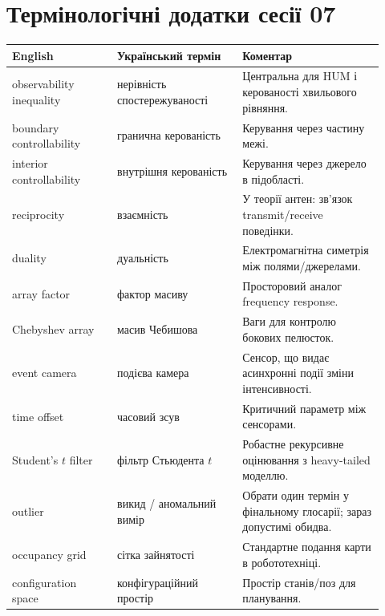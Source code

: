 \chapter{Термінологічні додатки сесії 07}

\begin{longtable}{L{0.26\linewidth}L{0.31\linewidth}L{0.35\linewidth}}
\toprule
English & Український термін & Коментар \\
\midrule
observability inequality & нерівність спостережуваності & Центральна для HUM і керованості хвильового рівняння. \\
boundary controllability & гранична керованість & Керування через частину межі. \\
interior controllability & внутрішня керованість & Керування через джерело в підобласті. \\
reciprocity & взаємність & У теорії антен: зв'язок transmit/receive поведінки. \\
duality & дуальність & Електромагнітна симетрія між полями/джерелами. \\
array factor & фактор масиву & Просторовий аналог frequency response. \\
Chebyshev array & масив Чебишова & Ваги для контролю бокових пелюсток. \\
event camera & подієва камера & Сенсор, що видає асинхронні події зміни інтенсивності. \\
time offset & часовий зсув & Критичний параметр між сенсорами. \\
Student's $t$ filter & фільтр Стьюдента $t$ & Робастне рекурсивне оцінювання з heavy-tailed моделлю. \\
outlier & викид / аномальний вимір & Обрати один термін у фінальному глосарії; зараз допустимі обидва. \\
occupancy grid & сітка зайнятості & Стандартне подання карти в робототехніці. \\
configuration space & конфігураційний простір & Простір станів/поз для планування. \\
\bottomrule
\end{longtable}
